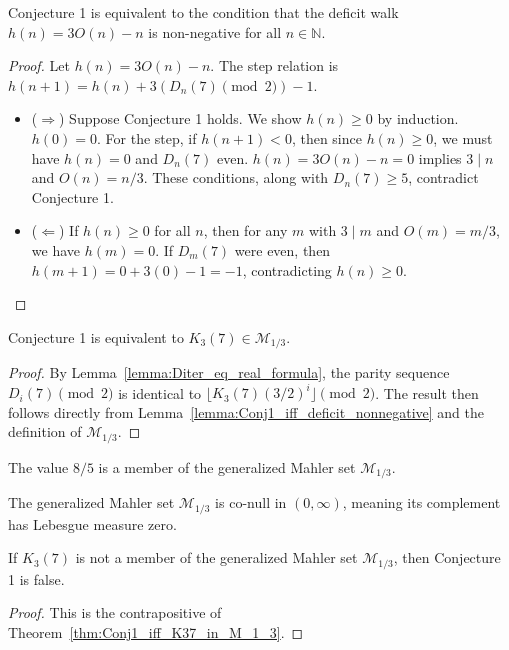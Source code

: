 \begin{lemma}
  \label{lemma:Conj1_iff_deficit_nonnegative}
  \leanok
  Conjecture 1 is equivalent to the condition that the deficit walk $h(n) = 3 O(n) - n$ is non-negative for all $n \in \mathbb{N}$.
  \begin{proof}
    \leanok
    Let $h(n) = 3 O(n) - n$. The step relation is $h(n+1) = h(n) + 3(D_n(7) \pmod 2) - 1$.
    \begin{itemize}
      \item ($\Rightarrow$) Suppose Conjecture 1 holds. We show $h(n) \ge 0$ by induction. $h(0)=0$. For the step, if $h(n+1) < 0$, then since $h(n) \ge 0$, we must have $h(n) = 0$ and $D_n(7)$ even. $h(n) = 3 O(n) - n = 0$ implies $3 \mid n$ and $O(n) = n/3$. These conditions, along with $D_n(7) \ge 5$, contradict Conjecture 1.
      \item ($\Leftarrow$) If $h(n) \ge 0$ for all $n$, then for any $m$ with $3 \mid m$ and $O(m) = m/3$, we have $h(m) = 0$. If $D_m(7)$ were even, then $h(m+1) = 0 + 3(0) - 1 = -1$, contradicting $h(n) \ge 0$.
    \end{itemize}
  \end{proof}
\end{lemma}

\begin{theorem}
  \label{thm:Conj1_iff_K37_in_M_1_3}
  \leanok
  Conjecture 1 is equivalent to $K_3(7) \in \mathcal{M}_{1/3}$.
  \begin{proof}
    \leanok
    By Lemma~\ref{lemma:Diter_eq_real_formula}, the parity sequence $D_i(7) \pmod 2$ is identical to $\lfloor K_3(7) (3/2)^i \rfloor \pmod 2$.
    The result then follows directly from Lemma~\ref{lemma:Conj1_iff_deficit_nonnegative} and the definition of $\mathcal{M}_{1/3}$.
  \end{proof}
\end{theorem}

\begin{lemma}
  \label{lemma:eight_fifths_in_M_1_3}
  \leanok
  The value $8/5$ is a member of the generalized Mahler set $\mathcal{M}_{1/3}$.
\end{lemma}

\begin{lemma}
  \label{lemma:M_1_3_co_null}
  \leanok
  The generalized Mahler set $\mathcal{M}_{1/3}$ is co-null in $(0, \infty)$, meaning its complement has Lebesgue measure zero.
\end{lemma}

\begin{theorem}
  \label{thm:not_in_mahler_implies_not_Conj1}
  \leanok
  If $K_3(7)$ is not a member of the generalized Mahler set $\mathcal{M}_{1/3}$, then Conjecture 1 is false.
  \begin{proof}
    \leanok
    This is the contrapositive of Theorem~\ref{thm:Conj1_iff_K37_in_M_1_3}.
  \end{proof}
\end{theorem}

